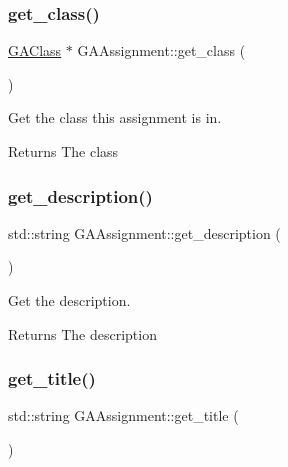 \subsubsection{\texorpdfstring{get\+\_\+class()}{get\_class()}}
{\footnotesize\ttfamily \hyperlink{class_g_a_class}{G\+A\+Class} $\ast$ G\+A\+Assignment\+::get\+\_\+class (\begin{DoxyParamCaption}{ }\end{DoxyParamCaption})}



Get the class this assignment is in. 

\begin{DoxyReturn}{Returns}
The class 
\end{DoxyReturn}
\mbox{\label{class_g_a_assignment_aa79940e35e148a0784b70efc33f93da4}} 
\subsubsection{\texorpdfstring{get\+\_\+description()}{get\_description()}}
{\footnotesize\ttfamily std\+::string G\+A\+Assignment\+::get\+\_\+description (\begin{DoxyParamCaption}{ }\end{DoxyParamCaption})}



Get the description. 

\begin{DoxyReturn}{Returns}
The description 
\end{DoxyReturn}
\mbox{\label{class_g_a_assignment_afd2ee339549f674108e1d0cb9996c1fe}} 
\subsubsection{\texorpdfstring{get\+\_\+title()}{get\_title()}}
{\footnotesize\ttfamily std\+::string G\+A\+Assignment\+::get\+\_\+title (\begin{DoxyParamCaption}{ }\end{DoxyParamCaption})}



